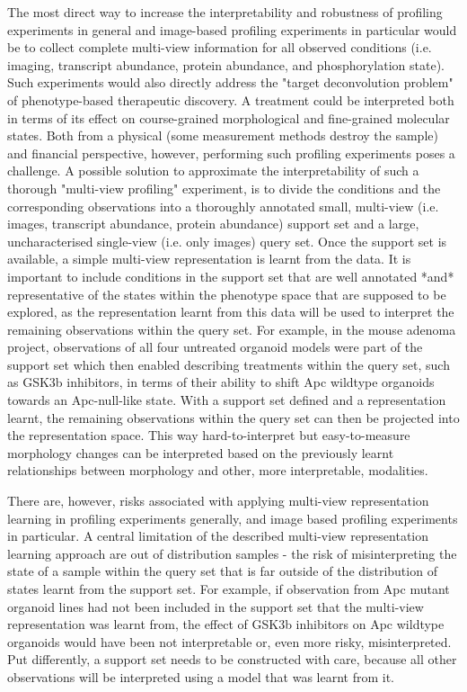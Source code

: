 \begin{flushleft}
The most direct way to increase the interpretability and robustness of profiling experiments in general and image-based profiling experiments in particular would be to collect complete multi-view information for all observed conditions (i.e. imaging, transcript abundance, protein abundance, and phosphorylation state). Such experiments would also directly address the "target deconvolution problem" of phenotype-based therapeutic discovery. A treatment could be interpreted both in terms of its effect on course-grained morphological and fine-grained molecular states. Both from a physical (some measurement methods destroy the sample) and financial perspective, however, performing such profiling experiments poses a challenge. A possible solution to approximate the interpretability of such a thorough "multi-view profiling" experiment, is to divide the conditions and the corresponding observations into a thoroughly annotated small, multi-view (i.e. images, transcript abundance, protein abundance) support set and a large, uncharacterised single-view (i.e. only images) query set. Once the support set is available, a simple multi-view representation is learnt from the data. It is important to include conditions in the support set that are well annotated *and* representative of the states within the phenotype space that are supposed to be explored, as the representation learnt from this data will be used to interpret the remaining observations within the query set. For example, in the mouse adenoma project, observations of all four untreated organoid models were part of the support set which then enabled describing treatments within the query set, such as GSK3b inhibitors, in terms of their ability to shift Apc wildtype organoids towards an Apc-null-like state. With a support set defined and a representation learnt, the remaining observations within the query set can then be projected into the representation space. This way hard-to-interpret but easy-to-measure morphology changes can be interpreted based on the previously learnt relationships between morphology and other, more interpretable, modalities.
\bigbreak

There are, however, risks associated with applying multi-view representation learning in profiling experiments generally, and image based profiling experiments in particular. A central limitation of the described multi-view representation learning approach are out of distribution samples - the risk of misinterpreting the state of a sample within the query set that is far outside of the distribution of states learnt from the support set. For example, if observation from Apc mutant organoid lines had not been included in the support set that the multi-view representation was learnt from, the effect of GSK3b inhibitors on Apc wildtype organoids would have been not interpretable or, even more risky, misinterpreted. Put differently, a support set needs to be constructed with care, because all other observations will be interpreted using a model that was learnt from it.
\bigbreak


\end{flushleft}

